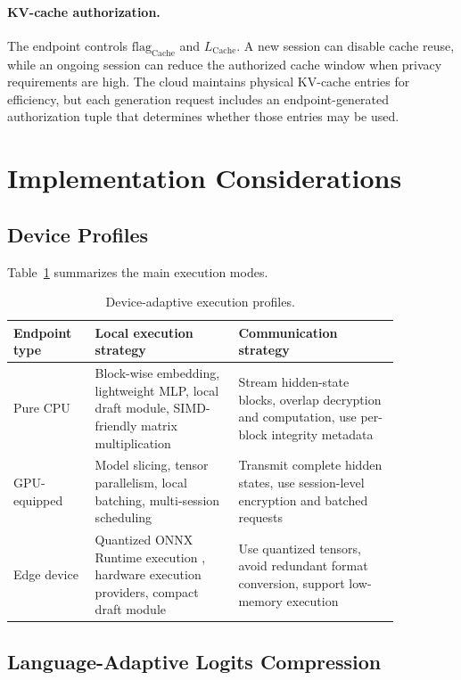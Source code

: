 \documentclass{article}
\newcommand{\Cache}{\mathrm{Cache}}
\begin{document}
\paragraph{KV-cache authorization.}
The endpoint controls $\mathrm{flag}_{\Cache}$ and $L_{\Cache}$. A new session can disable cache reuse, while an ongoing session can reduce the authorized cache window when privacy requirements are high. The cloud maintains physical KV-cache entries for efficiency, but each generation request includes an endpoint-generated authorization tuple that determines whether those entries may be used.

\FloatBarrier
\section{Implementation Considerations}

\subsection{Device Profiles}

Table~\ref{tab:profiles} summarizes the main execution modes.

\begin{table}[H]
\centering
\caption{Device-adaptive execution profiles.}
\label{tab:profiles}
\begin{tabular}{p{0.18\linewidth}p{0.32\linewidth}p{0.36\linewidth}}
\toprule
Endpoint type & Local execution strategy & Communication strategy \\
\midrule
Pure CPU & Block-wise embedding, lightweight MLP, local draft module, SIMD-friendly matrix multiplication & Stream hidden-state blocks, overlap decryption and computation, use per-block integrity metadata \\
GPU-equipped & Model slicing, tensor parallelism, local batching, multi-session scheduling & Transmit complete hidden states, use session-level encryption and batched requests \\
Edge device & Quantized ONNX Runtime execution \cite{onnxruntime}, hardware execution providers, compact draft module & Use quantized tensors, avoid redundant format conversion, support low-memory execution \\
\bottomrule
\end{tabular}
\end{table}

\subsection{Language-Adaptive Logits Compression}
\end{document}
